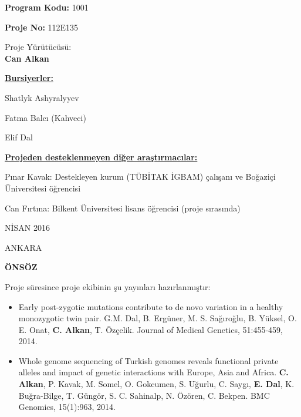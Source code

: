 \documentclass[11pt]{article}
\begin{document}
\bigskip

\bigskip


\thispagestyle{empty}


\begin{center}
\medskip
{\LARGE \textbf{Program Kodu:} 1001}

\bigskip
{\LARGE \textbf{Proje No:} 112E135}

\bigskip
{\LARGE Proje Yürütücüsü:\\
\textbf{Can Alkan}}

\end{center}



\bigskip


\bigskip
\noindent
{\large
\noindent
\underline{\bf Bursiyerler:}

\noindent
Shatlyk Ashyralyyev

\noindent
Fatma Balcı (Kahveci)

\noindent
Elif Dal

\noindent \underline{\bf Projeden desteklenmeyen diğer araştırmacılar:}

\noindent
Pınar Kavak: Destekleyen kurum (TÜBİTAK İGBAM) çalışanı ve Boğaziçi Üniversitesi öğrencisi

\noindent
Can Fırtına: Bilkent Üniversitesi lisans öğrencisi (proje sırasında)


}



\bigskip





\begin{center}
{\Large NİSAN 2016

\vspace{1mm}
ANKARA}
\end{center}


\linespread{1.5}

\newpage\setlength{\parskip}{3mm} 
\onehalfspacing
\bigskip
{}
\setcounter{page}{1}
\begin{center}
{\LARGE \bf ÖNSÖZ}
\end{center}


Proje süresince proje ekibinin şu yayınları hazırlanmıştır: 

\begin{itemize}
\item Early post-zygotic mutations contribute to de novo variation in a healthy monozygotic twin pair. G.M. Dal, B. Ergüner, M. S. Sağıroğlu, B. Yüksel, O. E. Onat, {\bf C. Alkan}, T. Özçelik. Journal of Medical Genetics, 51:455-459, 2014.
\item Whole genome sequencing of Turkish genomes reveals functional private alleles and impact of genetic interactions with Europe, Asia and Africa. {\bf C. Alkan}, P.  Kavak, M. Somel, O. Gokcumen, 
  S. Uğurlu, C. Saygı, {\bf E. Dal}, K. Buğra-Bilge,  T. Güngör, S. C. Sahinalp, N. Özören, C. Bekpen. BMC Genomics, 15(1):963, 2014.
\end{itemize}
\end{document}
